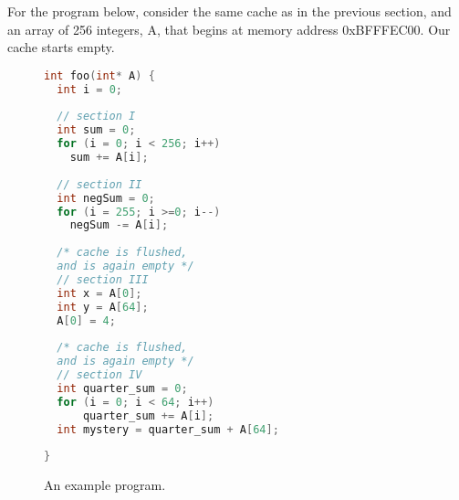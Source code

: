 \documentclass{article}
\begin{document}
For the program below, consider the same cache as in the previous section, and an array of 256 integers, A, that begins at memory address 0xBFFFEC00. Our cache starts empty.
\begin{figure}
\centering
\begin{minipage}{0.5\textwidth}
\renewcommand{\ttdefault}{pcr}
\begin{lstlisting}[language=C, basicstyle=\ttfamily,  keywordstyle=\bfseries, showstringspaces=false]
int foo(int* A) {
  int i = 0;
  
  // section I
  int sum = 0;
  for (i = 0; i < 256; i++)
    sum += A[i];
  
  // section II
  int negSum = 0;
  for (i = 255; i >=0; i--)
    negSum -= A[i];
    
  /* cache is flushed, 
  and is again empty */
  // section III
  int x = A[0];
  int y = A[64];
  A[0] = 4;
  
  /* cache is flushed,
  and is again empty */
  // section IV
  int quarter_sum = 0;
  for (i = 0; i < 64; i++)
      quarter_sum += A[i];
  int mystery = quarter_sum + A[64];
  
}
\end{lstlisting}
\caption{An example program.}


\end{minipage}
\end{figure}
\end{document}
